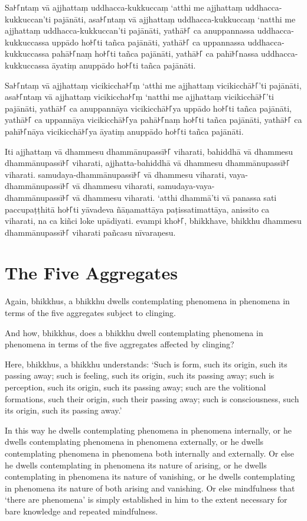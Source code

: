 \paliPage

Sa꜔꜒ntaṃ vā ajjhattaṃ uddhacca-kukkuccaṃ ‘atthi me ajjhattaṃ uddhacca-kukkuccan’ti pajānāti,
asa꜔꜒ntaṃ vā ajjhattaṃ uddhacca-kukkuccaṃ ‘natthi me ajjhattaṃ uddhacca-kukkuccan’ti pajānāti,
yathā꜔꜒ ca anuppannassa uddhacca-kukkuccassa uppādo ho꜔꜒ti tañca pajānāti,
yathā꜔꜒ ca uppannassa uddhacca-kukkuccassa pahā꜔꜒naṃ ho꜔꜒ti tañca pajānāti,
yathā꜔꜒ ca pahī꜔꜒nassa uddhacca-kukkuccassa āyatiṃ anuppādo ho꜔꜒ti tañca pajānāti.

Sa꜔꜒ntaṃ vā ajjhattaṃ vicikiccha꜔꜒ṃ ‘atthi me ajjhattaṃ vicikicchā꜔꜒’ti pajānāti,
asa꜔꜒ntaṃ vā ajjhattaṃ vicikiccha꜔꜒ṃ ‘natthi me ajjhattaṃ vicikicchā꜔꜒’ti pajānāti,
yathā꜔꜒ ca anuppannāya vicikicchā꜔꜒ya uppādo ho꜔꜒ti tañca pajānāti,
yathā꜔꜒ ca uppannāya vicikicchā꜔꜒ya pahā꜔꜒naṃ ho꜔꜒ti tañca pajānāti,
yathā꜔꜒ ca pahī꜔꜒nāya vicikicchā꜔꜒ya āyatiṃ anuppādo ho꜔꜒ti tañca pajānāti.

Iti ajjhattaṃ vā dhammesu dhammānupassī꜔꜒ viharati,
bahiddhā vā dhammesu dhammānupassī꜔꜒ viharati,
ajjhatta-bahiddhā vā dhammesu dhammānupassī꜔꜒ viharati.
samudaya-dhammānupassī꜔꜒ vā dhammesu viharati,
vaya-dhammānupassī꜔꜒ vā dhammesu viharati,
samudaya-vaya-\\ dhammānupassī꜔꜒ vā dhammesu viharati.
‘atthi dhammā’ti vā panassa sati paccupaṭṭhitā ho꜔꜒ti
yāvadeva ñāṇamattāya paṭissatimattāya, anissito ca viharati,
na ca kiñci loke upādiyati. evampi kho꜔꜒, bhikkhave, bhikkhu
dhammesu dhammānupassī꜔꜒ viharati pañcasu nīvaraṇesu.


\englishPage
\section{The Five Aggregates}

Again, bhikkhus, a bhikkhu dwells contemplating phenomena in phenomena in terms
of the five aggregates subject to clinging.

And how, bhikkhus, does a bhikkhu dwell contemplating phenomena in phenomena in
terms of the five aggregates affected by clinging?

Here, bhikkhus, a bhikkhu understands:
`Such is form, such its origin, such its passing away;
such is feeling, such its origin, such its passing away;
such is perception, such its origin, such its passing away;
such are the volitional formations, such their origin, such their passing away;
such is consciousness, such its origin, such its passing away.'

In this way he dwells contemplating phenomena in phenomena internally, or he
dwells contemplating phenomena in phenomena externally, or he dwells
contemplating phenomena in phenomena both internally and externally. Or else he
dwells contemplating in phenomena its nature of arising, or he dwells
contemplating in phenomena its nature of vanishing, or he dwells contemplating
in phenomena its nature of both arising and vanishing. Or else mindfulness that
‘there are phenomena’ is simply established in him to the extent necessary for
bare knowledge and repeated mindfulness.

